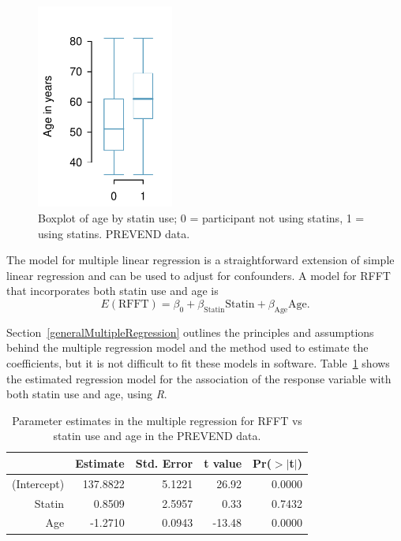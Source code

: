  \begin{figure}[h!]
 	\centering
 	\includegraphics[width=0.4\textwidth]
	{ch_multiple_linear_regression_oi_biostat/figures/statinAgeBoxPlot/statinAgeBoxPlot.pdf}
 	\caption{Boxplot of age by statin use; 0 = participant not using statins, 1 = using statins. PREVEND data.}
	\label{statinAgeBoxPlot}
 \end{figure}
  
 The model for multiple linear regression is a straightforward extension of simple linear regression and can be used to adjust for confounders.  A model for RFFT that incorporates both statin use and age is
 \[
    E(\text{RFFT}) = \beta_0 + \beta_{\text{Statin}}\text{Statin} + \beta_{\text{Age}}\text{Age}.
 \]
 
 Section~\ref{generalMultipleRegression} outlines the principles and assumptions behind the multiple regression model and the method used to estimate the coefficients, but it is not difficult to fit these models in software.  Table~\ref{RFFTStatinAgeRegression} shows the estimated regression model for the association of the response variable  with both statin use and age, using \textsl{R}.  
 
 
 \begin{table}[ht]
 \centering
 \begin{tabular}{rrrrr}
   \hline
  & Estimate & Std. Error & t value & Pr($>$$|$t$|$) \\ 
   \hline
 (Intercept) & 137.8822 & 5.1221 & 26.92 & 0.0000 \\ 
   Statin & 0.8509 & 2.5957 & 0.33 & 0.7432 \\ 
   Age & -1.2710 & 0.0943 & -13.48 & 0.0000 \\ 
    \hline
 \end{tabular}
 \caption{Parameter estimates in the multiple regression for RFFT vs statin use and age in the PREVEND data.}
 \label{RFFTStatinAgeRegression}
 \end{table}
 

